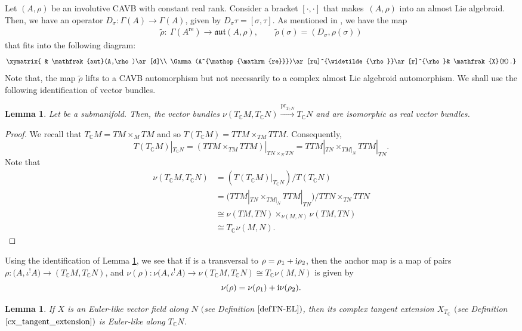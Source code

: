 \documentclass[pdftex]{sigma}
\numberwithin{equation}{section}
\newtheorem{Lemma}[Theorem]{Lemma}
\newcommand{\C}{{\mathbb{C}}}
\DeclareMathOperator{\pr}{pr}
\DeclareMathOperator{\real}{re}
\begin{document}
Let $(A,\rho)$ be an involutive CAVB with constant real rank. Consider a bracket $[\cdot,\cdot]$ that makes~$(A,\rho)$ into an almost Lie algebroid. Then, we have an operator $D_{\sigma}\colon \Gamma(A)\to \Gamma(A)$, given by $D_{\sigma}\tau=[\sigma,\tau]$. As mentioned in \cite{bischoff2020deformation}, we have the map
\begin{gather*}
\widetilde{\rho}\colon \ \Gamma (A^{\real}) \to \mathfrak{aut}(A,\rho),\qquad
\widetilde{\rho}(\sigma)=(D_{\sigma}, \rho(\sigma))
\end{gather*}
that fits into the following diagram:
\begin{equation}{\label{lifting_aut}}
\xymatrix{
& \mathfrak{aut}(A,\rho)\ar[d]\\
\Gamma(A^{\real})\ar[ru]^{\widetilde{\rho}}\ar[r]^{\rho}& \mathfrak{X}(M).}
\end{equation}
Note that, the map $\widetilde{\rho}$ lifts to a CAVB automorphism but not necessarily to a complex almost Lie algebroid automorphism.
We shall use the following identification of vector bundles.
\begin{Lemma}\label{identification_cx}
Let  be a submanifold. Then, the vector bundles ${\nu(T_{\C}M,T_{\C}N)\!\xrightarrow{\pr_{T_{\C}N}}\! T_{\C}N}$ and \smash{$T_{\C}\nu(M,N)\xrightarrow{T_{\C}\pr_N} T_{\C}N$} are isomorphic as real vector bundles.
\end{Lemma}
\begin{proof}
  We recall that $T_{\C}M=TM\times_M TM$ and so $ T(T_{\C}M)=TTM\times_{TM} TTM$. Consequently,
  \[ T(T_{\C}M)|_{T_{\C}N}=(TTM\times_{TM} TTM)|_{TN\times_{N}TN}=TTM|_{TN}\times_{TM|_N} TTM|_{TN}.\]
  Note that
  \begin{align*}
  \nu(T_{\C}M,T_{\C}N)&{}=(T(T_{\C}M)|_{T_{\C}N})/T(T_{\C}N)\\
  &{}=\bigl(TTM|_{TN}\times_{TM|_N} TTM|_{TN}\bigr)/TTN\times_{TN} TTN\\
  &{}\cong \nu(TM,TN)\times_{\nu(M,N)}\nu(TM,TN)\\
  &{}\cong T_{\C}\nu(M,N).
\tag*{\qed}
\end{align*}
\renewcommand{\qed}{}
\end{proof}

\begin{Remark}%
   Using the identification of Lemma \ref{identification_cx}, we see that if  is a transversal to $\rho=\rho_1+{\rm i}\rho_2$, then the anchor map is a map of pairs $\rho\colon \bigl(A,\iota^{!}A\bigr)\to (T_{\C}M, T_{\C}N)$, and $\nu(\rho)\colon \nu\bigl(A,\iota^{!}A\bigr)\to \nu(T_{\C}M, T_{\C}N)\cong T_{\C}\nu(M,N)$ is given by
  \[
  \nu(\rho)=\nu(\rho_1)+{\rm i}\nu(\rho_2).
  \]
\end{Remark}
\begin{Lemma}
   If $X$ is an Euler-like vector field along $N$ $($see Definition $\ref{defTN-EL})$, then its complex tangent extension $X_{T_{\C}}$ $($see Definition $\ref{cx_tangent_extension})$ is Euler-like along $T_{\C}N$.
\end{Lemma}
\end{document}

